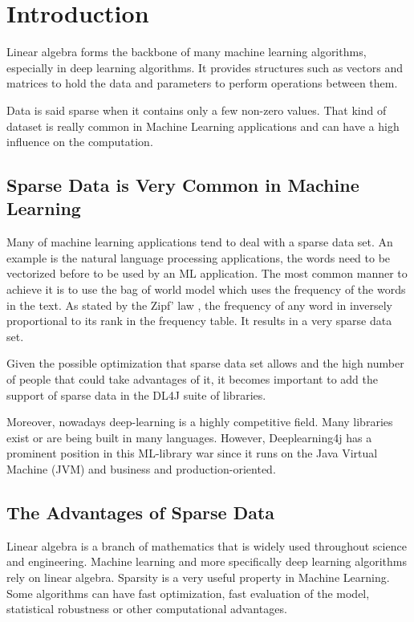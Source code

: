 \chapter{Introduction}


Linear algebra forms the backbone of many machine learning algorithms, especially in deep learning algorithms. It provides structures such as vectors and matrices to hold the data and parameters to perform operations between them. 

Data is said sparse when it contains only a few non-zero values. That kind of dataset is really common in Machine Learning applications and can have a high influence on the computation.  

\section{Sparse Data is Very Common in Machine Learning}

Many of machine learning applications tend to deal with a sparse data set. An example is the natural language processing applications, the words need to be vectorized before to be used by an ML application. The most common manner to achieve it is to use the bag of world model which uses the frequency of the words in the text. As stated by the Zipf' law \cite{Zipf}, the frequency of any word in inversely proportional to its rank in the frequency table. It results in a very sparse data set.

Given the possible optimization that sparse data set allows and the high number of people that could take advantages of it, it becomes important to add the support of sparse data in the DL4J suite of libraries. 

Moreover, nowadays deep-learning is a highly competitive field. Many libraries exist or are being built in many languages. However, Deeplearning4j has a prominent position in this ML-library war since it runs on the Java Virtual Machine (JVM) and business and production-oriented.



\section{The Advantages of Sparse Data}
Linear algebra is a branch of mathematics that is widely used throughout science and engineering. Machine learning and more specifically deep learning algorithms rely on linear algebra. Sparsity is a very useful property in Machine Learning. Some algorithms can have fast optimization, fast evaluation of the model, statistical robustness or other computational advantages.


